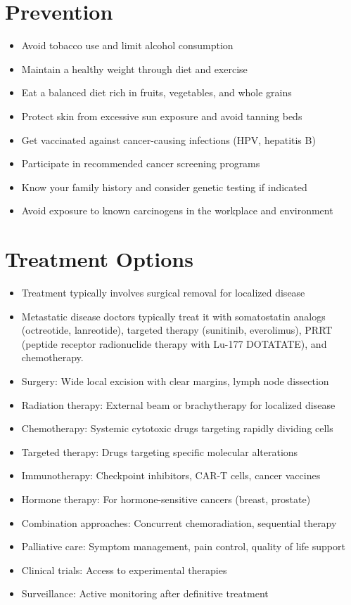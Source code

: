 \section{Prevention}
\begin{itemize}[noitemsep]
  \item Avoid tobacco use and limit alcohol consumption
  \item Maintain a healthy weight through diet and exercise
  \item Eat a balanced diet rich in fruits, vegetables, and whole grains
  \item Protect skin from excessive sun exposure and avoid tanning beds
  \item Get vaccinated against cancer-causing infections (HPV, hepatitis B)
  \item Participate in recommended cancer screening programs
  \item Know your family history and consider genetic testing if indicated
  \item Avoid exposure to known carcinogens in the workplace and environment
\end{itemize}
\section{Treatment Options}
\begin{itemize}[noitemsep]
  \item Treatment typically involves surgical removal for localized disease
  \item Metastatic disease doctors typically treat it with somatostatin analogs (octreotide, lanreotide), targeted therapy (sunitinib, everolimus), PRRT (peptide receptor radionuclide therapy with Lu-177 DOTATATE), and chemotherapy.
  \item Surgery: Wide local excision with clear margins, lymph node dissection
  \item Radiation therapy: External beam or brachytherapy for localized disease
  \item Chemotherapy: Systemic cytotoxic drugs targeting rapidly dividing cells
  \item Targeted therapy: Drugs targeting specific molecular alterations
  \item Immunotherapy: Checkpoint inhibitors, CAR-T cells, cancer vaccines
  \item Hormone therapy: For hormone-sensitive cancers (breast, prostate)
  \item Combination approaches: Concurrent chemoradiation, sequential therapy
  \item Palliative care: Symptom management, pain control, quality of life support
  \item Clinical trials: Access to experimental therapies
  \item Surveillance: Active monitoring after definitive treatment
\end{itemize}
